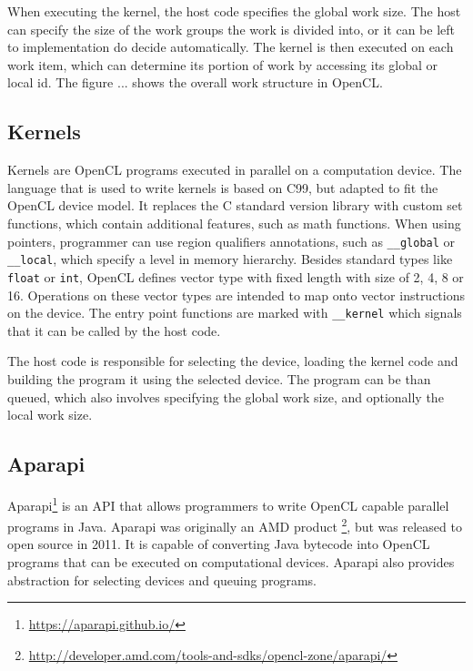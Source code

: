 \documentclass{l4proj}
\begin{document}
When executing the kernel, the host code specifies the global work size. The host can specify 
the size of the work groups the work is divided into, or it can be left to implementation do decide
automatically. The kernel is then executed on each work item, which can determine its portion 
of work by accessing its global or local id. The figure ... shows the overall work structure in OpenCL.

\subsection{Kernels}

Kernels are OpenCL programs executed in parallel on a computation device. The language that is
used to write kernels is based on C99, but adapted to fit the OpenCL device model. It replaces 
the C standard version library with custom set functions, which contain additional features, such as 
math functions. When using pointers, programmer can use region qualifiers annotations, such as
\texttt{\_\_global} or \texttt{\_\_local}, which specify a level in memory hierarchy. Besides standard
types like \texttt{float} or \texttt{int}, OpenCL defines vector type with fixed length with size
of 2, 4, 8 or 16. Operations on these vector types are intended to map onto vector instructions on the device.
The entry point functions are marked with \texttt{\_\_kernel} which signals that it can be called by the host code.

The host code is responsible for selecting the device, loading the kernel code and building the 
program it using the selected device. The program can be than queued, which also involves specifying
the global work size, and optionally the local work size.

\subsection{Aparapi}

Aparapi\footnote{\url{https://aparapi.github.io/}} is an API that allows programmers
to write OpenCL capable parallel programs in Java. Aparapi was originally an AMD 
product \footnote{\url{http://developer.amd.com/tools-and-sdks/opencl-zone/aparapi/}},
but was released to open source in 2011. It is capable of converting Java bytecode
into OpenCL programs that can be executed on computational devices. Aparapi also 
provides abstraction for selecting devices and queuing programs. 
\end{document}

